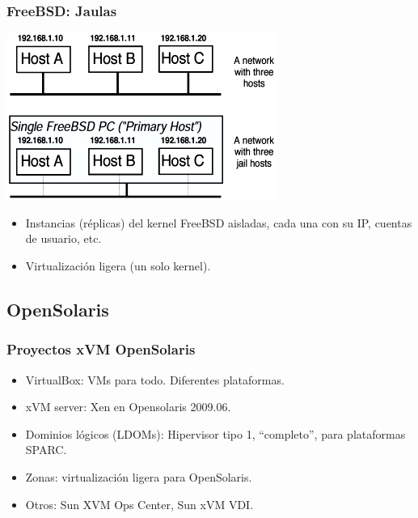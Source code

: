 \documentclass{beamer}
\begin{document}
\begin{frame}
\frametitle{FreeBSD: Jaulas}

\begin{center}
\includegraphics[scale=0.50,clip=false]{figs/armitage3.png}
\end{center}

\begin{itemize}
\item Instancias (réplicas) del kernel FreeBSD aisladas, cada una con su IP, cuentas de usuario, etc.
\item Virtualización ligera (un solo kernel).
\end{itemize}

\end{frame}




\subsection{OpenSolaris}

\begin{frame}
\frametitle{Proyectos xVM OpenSolaris}

\begin{itemize}
\item \alert{VirtualBox}: VMs para todo. Diferentes plataformas.
\item \alert{xVM server}: Xen en Opensolaris 2009.06.
\item Dominios lógicos (\alert{LDOMs}): Hipervisor tipo 1, ``completo'', para plataformas SPARC.
\item \alert{Zonas}: virtualización ligera para OpenSolaris.
\item Otros: Sun XVM Ops Center, Sun xVM VDI.
\end{itemize}

\end{frame}
\end{document}
